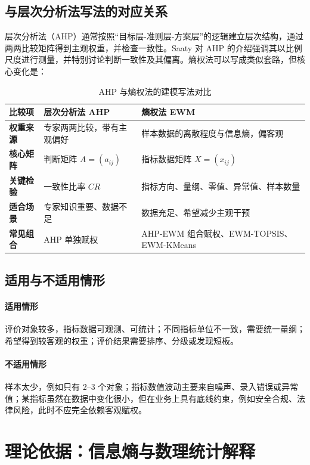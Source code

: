 \documentclass[UTF8,zihao=-4]{ctexart}
\begin{document}
\subsection{与层次分析法写法的对应关系}
层次分析法（AHP）通常按照“目标层-准则层-方案层”的逻辑建立层次结构，通过两两比较矩阵得到主观权重，并检查一致性。Saaty 对 AHP 的介绍强调其以比例尺度进行测量，并特别讨论判断一致性及其偏离\cite{saaty1987ahp}。熵权法可以写成类似套路，但核心变化是：

\begin{table}[H]
\centering
\caption{AHP 与熵权法的建模写法对比}
\begin{tabularx}{\textwidth}{>{\bfseries}p{3.1cm}X X}
\toprule
比较项 & 层次分析法 AHP & 熵权法 EWM \\
\midrule
权重来源 & 专家两两比较，带有主观偏好 & 样本数据的离散程度与信息熵，偏客观 \\
核心矩阵 & 判断矩阵 $A=(a_{ij})$ & 指标数据矩阵 $X=(x_{ij})$ \\
关键检验 & 一致性比率 $CR$ & 指标方向、量纲、零值、异常值、样本数量 \\
适合场景 & 专家知识重要、数据不足 & 数据充足、希望减少主观干预 \\
常见组合 & AHP 单独赋权 & AHP-EWM 组合赋权、EWM-TOPSIS、EWM-KMeans \\
\bottomrule
\end{tabularx}
\end{table}

\subsection{适用与不适用情形}

\paragraph{适用情形}评价对象较多，指标数据可观测、可统计；不同指标单位不一致，需要统一量纲；希望得到较客观的权重；评价结果需要排序、分级或发现短板。

\paragraph{不适用情形}样本太少，例如只有 2--3 个对象；指标数值波动主要来自噪声、录入错误或异常值；某指标虽然在数据中变化很小，但在业务上具有底线约束，例如安全合规、法律风险，此时不应完全依赖客观赋权。

\section{理论依据：信息熵与数理统计解释}
\end{document}
